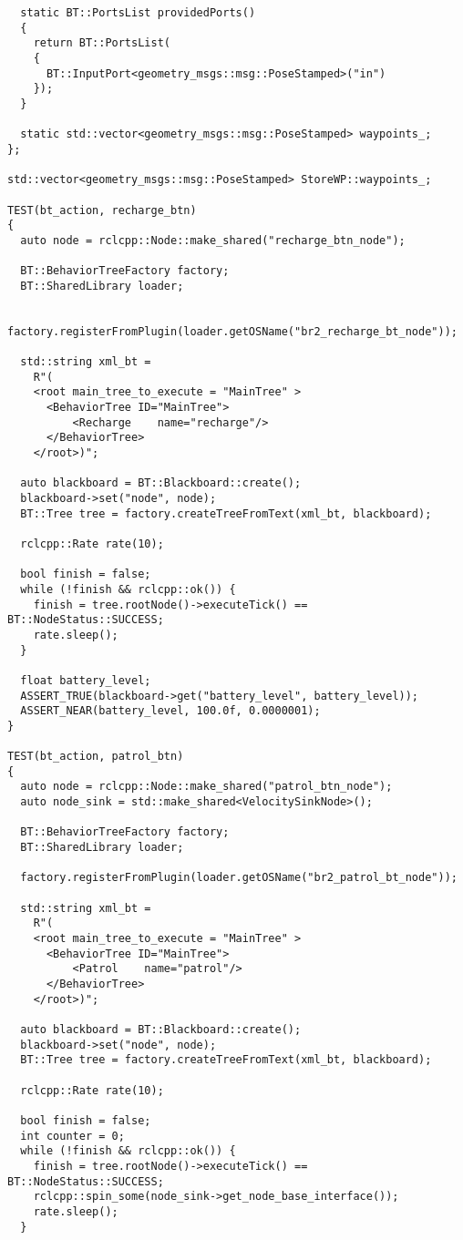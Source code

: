 \begin{tcolorbox}[sharp corners, colframe=gray!80, colback=LightGray, left=0pt, top=0pt, bottom=0pt, title=\texttt{br2\_bt\_patrolling/tests/bt\_action\_test.cpp}]
\begin{verbatim}
  static BT::PortsList providedPorts()
  {
    return BT::PortsList(
    {
      BT::InputPort<geometry_msgs::msg::PoseStamped>("in")
    });
  }

  static std::vector<geometry_msgs::msg::PoseStamped> waypoints_;
};

std::vector<geometry_msgs::msg::PoseStamped> StoreWP::waypoints_;

TEST(bt_action, recharge_btn)
{
  auto node = rclcpp::Node::make_shared("recharge_btn_node");

  BT::BehaviorTreeFactory factory;
  BT::SharedLibrary loader;

  factory.registerFromPlugin(loader.getOSName("br2_recharge_bt_node"));

  std::string xml_bt =
    R"(
    <root main_tree_to_execute = "MainTree" >
      <BehaviorTree ID="MainTree">
          <Recharge    name="recharge"/>
      </BehaviorTree>
    </root>)";

  auto blackboard = BT::Blackboard::create();
  blackboard->set("node", node);
  BT::Tree tree = factory.createTreeFromText(xml_bt, blackboard);

  rclcpp::Rate rate(10);

  bool finish = false;
  while (!finish && rclcpp::ok()) {
    finish = tree.rootNode()->executeTick() == BT::NodeStatus::SUCCESS;
    rate.sleep();
  }

  float battery_level;
  ASSERT_TRUE(blackboard->get("battery_level", battery_level));
  ASSERT_NEAR(battery_level, 100.0f, 0.0000001);
}

TEST(bt_action, patrol_btn)
{
  auto node = rclcpp::Node::make_shared("patrol_btn_node");
  auto node_sink = std::make_shared<VelocitySinkNode>();

  BT::BehaviorTreeFactory factory;
  BT::SharedLibrary loader;

  factory.registerFromPlugin(loader.getOSName("br2_patrol_bt_node"));

  std::string xml_bt =
    R"(
    <root main_tree_to_execute = "MainTree" >
      <BehaviorTree ID="MainTree">
          <Patrol    name="patrol"/>
      </BehaviorTree>
    </root>)";

  auto blackboard = BT::Blackboard::create();
  blackboard->set("node", node);
  BT::Tree tree = factory.createTreeFromText(xml_bt, blackboard);

  rclcpp::Rate rate(10);

  bool finish = false;
  int counter = 0;
  while (!finish && rclcpp::ok()) {
    finish = tree.rootNode()->executeTick() == BT::NodeStatus::SUCCESS;
    rclcpp::spin_some(node_sink->get_node_base_interface());
    rate.sleep();
  }


\end{verbatim}
\end{tcolorbox}
